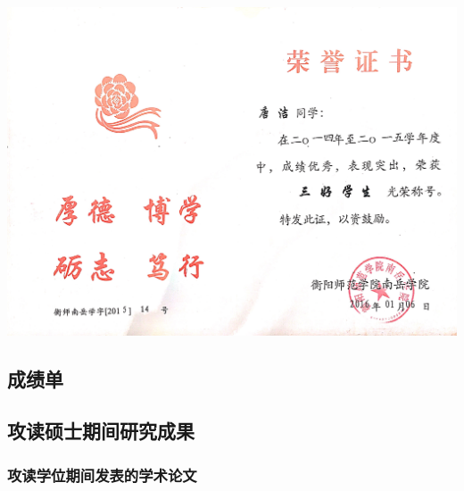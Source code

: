 \documentclass[UFT8]{ctexart}%
\begin{document}
\begin{center}
 \includegraphics[scale=0.1]{figs/20160106_2.JPG }
\end{center}


\subsection{成绩单}

%
%

\subsection{攻读硕士期间研究成果}
\subsubsection{攻读学位期间发表的学术论文}
\end{document}
